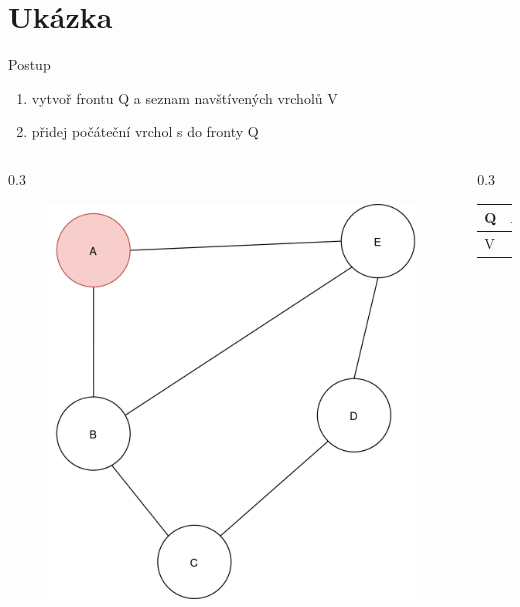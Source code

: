 \documentclass[hyperref={unicode}]{beamer}
\begin{document}
\section{Ukázka}
\begin{frame}
\begin{block}{Postup}
\begin{enumerate}
  [default]
    \item vytvoř frontu Q a seznam navštívených vrcholů V
    \item přidej počáteční vrchol s do fronty Q
\end{enumerate}
\end{block}
  \begin{columns}[T]
    \begin{column}{0.3\linewidth}
        \begin{figure}
        \includegraphics[width=\linewidth]{state1.png}
        \end{figure}
    \end{column}
    \begin{column}{0.3\linewidth}
    \begin{table}[]
        \begin{tabular}{|l||l|l|l|}
        \hline
        Q & A &  &  \\ \hline
        V &  &  &  \\ \hline
        \end{tabular}
\end{table}
    \end{column}
  \end{columns}
\end{frame}
\end{document}
